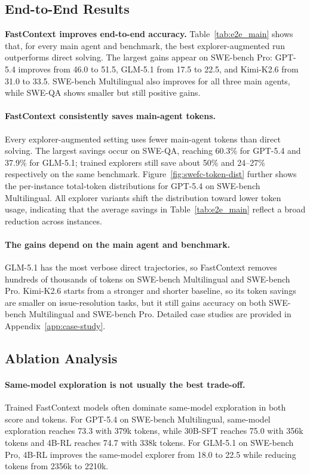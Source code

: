 \documentclass[11pt]{article}
\newcommand{\approach}{{FastContext}\xspace}
\begin{document}

\subsection{End-to-End Results}
\label{sec:e2e-results}
\vspace{-1mm}
\textbf{\approach improves end-to-end accuracy.}
Table~\ref{tab:e2e_main} shows that, for every main agent and benchmark, the best explorer-augmented run outperforms direct solving.
The largest gains appear on SWE-bench Pro: GPT-5.4 improves from 46.0 to 51.5, GLM-5.1 from 17.5 to 22.5, and Kimi-K2.6 from 31.0 to 33.5.
SWE-bench Multilingual also improves for all three main agents, while SWE-QA shows smaller but still positive gains.


\paragraph{\approach consistently saves main-agent tokens.}
Every explorer-augmented setting uses fewer main-agent tokens than direct solving.
The largest savings occur on SWE-QA, reaching 60.3\% for GPT-5.4 and 37.9\% for GLM-5.1; trained explorers still save about 50\% and 24--27\% respectively on the same benchmark.
Figure~\ref{fig:swefc-token-dist} further shows the per-instance total-token distributions for GPT-5.4 on SWE-bench Multilingual.
All explorer variants shift the distribution toward lower token usage, indicating that the average savings in Table~\ref{tab:e2e_main} reflect a broad reduction across instances.


\paragraph{The gains depend on the main agent and benchmark.}
GLM-5.1 has the most verbose direct trajectories, so \approach removes hundreds of thousands of tokens on SWE-bench Multilingual and SWE-bench Pro.
Kimi-K2.6 starts from a stronger and shorter baseline, so its token savings are smaller on issue-resolution tasks, but it still gains accuracy on both SWE-bench Multilingual and SWE-bench Pro.
Detailed case studies are provided in Appendix~\ref{app:case-study}.


\subsection{Ablation Analysis}
\label{sec:e2e-ablation}

\paragraph{Same-model exploration is not usually the best trade-off.}
Trained \approach models often dominate same-model exploration in both score and tokens.
For GPT-5.4 on SWE-bench Multilingual, same-model exploration reaches 73.3 with 379k tokens, while 30B-SFT reaches 75.0 with 356k tokens and 4B-RL reaches 74.7 with 338k tokens.
For GLM-5.1 on SWE-bench Pro, 4B-RL improves the same-model explorer from 18.0 to 22.5 while reducing tokens from 2356k to 2210k.
\end{document}
